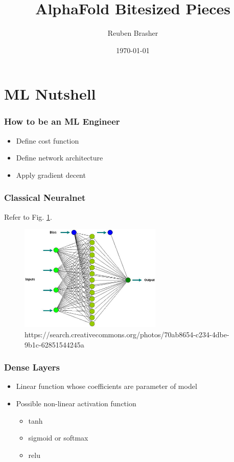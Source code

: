 \documentclass{beamer}
\title{AlphaFold Bitesized Pieces}
\author{Reuben Brasher}
\date{\today}
\begin{document}
\frame{\titlepage}

\section[Outline]{}
\frame{\tableofcontents}

\section{ML Nutshell}
\frame
{
   \frametitle{How to be an ML Engineer}

   \begin{itemize}
      \item<1-> Define cost function

      \item<2-> Define network architecture
      
      \item<3-> Apply gradient decent
      
   \end{itemize}
}

\frame
{
   \frametitle{Classical Neuralnet}
   
   Refer to Fig. \ref{fig:neuralnet}.
   
   \begin{figure}[ht]
      \includegraphics[height=2in,keepaspectratio]{images/7880863848_0698ba4909.jpg}
      \caption{https://search.creativecommons.org/photos/70ab8654-c234-4dbe-9b1c-62851544245a} \label{fig:neuralnet}
   \end{figure}
}

\frame
{
   \frametitle{Dense Layers}

   \begin{itemize}
      \item<1-> Linear function whose coefficients are parameter of model

      \item<2-> Possible non-linear activation function

      \begin{itemize}
         \item tanh
         \item sigmoid or softmax
         \item relu
      \end{itemize}
      
   \end{itemize}
}
\end{document}
